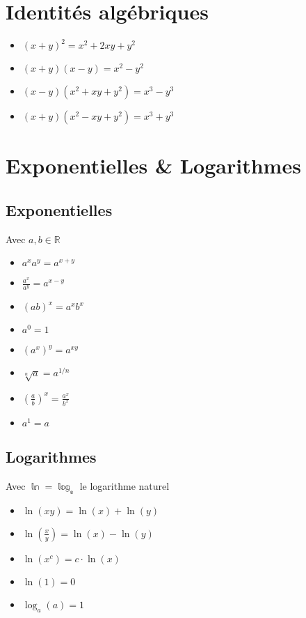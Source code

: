 \documentclass[10pt,a4paper]{book}
\newcommand{\R}{\mathbb{R}}
\begin{document}
\section{Identités algébriques}

\begin{itemize}
\item $(x+y)^2 = x^2 + 2xy + y^2$
\item $(x+y)(x-y) = x^2-y^2$
\item $(x-y)(x^2+xy+y^2) = x^3-y^3$
\item $(x+y)(x^2-xy+y^2) = x^3+y^3$
\end{itemize}

\section{Exponentielles \& Logarithmes}

\subsection{Exponentielles}

Avec $a,b \in \R$
\begin{itemize}
\item $a^xa^y = a^{x+y}$
\item $\frac{a^x}{a^y} = a^{x-y}$
\item $(ab)^x = a^xb^x$
\item $a^0 = 1$
\item $(a^x)^y = a^{xy}$
\item $\sqrt[n]{a} = a^{1/n}$
\item $\left(\frac{a}{b}\right)^x = \frac{a^x}{b^x}$
\item $a^1 = a$
\end{itemize}

\subsection{Logarithmes}

Avec $\mathbb{\ln = \log_e}$ le logarithme naturel
\begin{itemize}
\item $\ln(xy) = \ln(x) + \ln(y)$
\item $\ln(\frac{x}{y}) = \ln(x) - \ln(y)$
\item $\ln(x^c) = c\cdot \ln(x)$
\item $\ln(1) = 0$
\item $\log_a(a) = 1$
\end{itemize}
\end{document}
